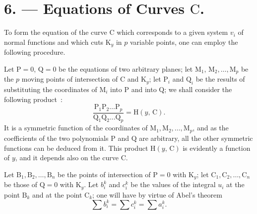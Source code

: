 \documentclass{article}
\begin{document}
\section*{6. --- Equations of Curves $\mathrm{C}$.}

To form the equation of the curve $\mathrm{C}$ which corresponds to a given system $v_{i}$ of normal functions and which cuts $\mathrm{K}_{y}$ in $p$ variable points, one can employ the following procedure.

Let $\mathrm{P} = 0$, $\mathrm{Q} = 0$ be the equations of two arbitrary planes; let $\mathrm{M}_{1}$,
$\mathrm{M}_{2}, \ldots, \mathrm{M}_{p}$ be the $p$ moving points of intersection of $\mathrm{C}$ and $\mathrm{K}_{y}$; let $\mathrm{P}_{i}$ and $\mathrm{Q}_{i}$ be the results of substituting the coordinates of $\mathrm{M}_{i}$ into $\mathrm{P}$ and into $\mathrm{Q}$; we shall consider the following product~:
\[
\frac{\mathrm{P}_{1}\mathrm{P}_{2}\ldots\mathrm{P}_{p}}{\mathrm{Q}_{1}\mathrm{Q}_{2}\ldots\mathrm{Q}_{p}} = \mathrm{H}(y,\, \mathrm{C}).
\]
It is a symmetric function of the coordinates of $\mathrm{M}_{1}, \mathrm{M}_{2}, \ldots, \mathrm{M}_{p}$, and as the coefficients of the two polynomials $\mathrm{P}$ and $\mathrm{Q}$ are arbitrary, all the other symmetric functions can be deduced from it. This product $\mathrm{H}(y,\, \mathrm{C})$ is evidently a function of $y$, and it depends also on the curve $\mathrm{C}$.

Let $\mathrm{B}_{1}, \mathrm{B}_{2}, \ldots, \mathrm{B}_{n}$ be the points of intersection of $\mathrm{P} = 0$ with $\mathrm{K}_{y}$; let $\mathrm{C}_{1}, \mathrm{C}_{2}, \ldots, \mathrm{C}_{n}$ be those of $\mathrm{Q} = 0$ with $\mathrm{K}_{y}$. Let $b_{i}^{k}$ and $c_{i}^{k}$ be the values of the integral $u_{i}$ at the point $\mathrm{B}_{k}$ and at the point $\mathrm{C}_{k}$; one will have by virtue of Abel's theorem
\[
\sum b_{i}^{k} = \sum c_{i}^{k} = \sum a_{i}^{k}. \tag{3}
\]
\end{document}
